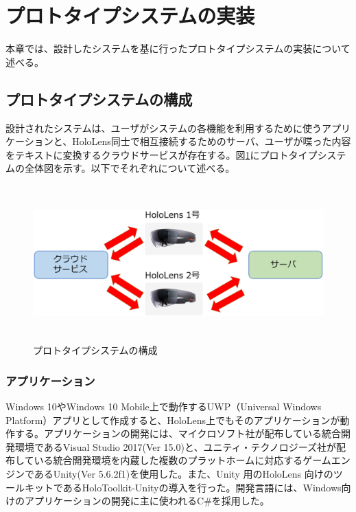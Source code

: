 \documentclass[11pt,a4j, titlepage]{jarticle} %
\begin{document}
\newpage
\section{プロトタイプシステムの実装}
本章では、設計したシステムを基に行ったプロトタイプシステムの実装について述べる。

\subsection{プロトタイプシステムの構成}
設計されたシステムは、ユーザがシステムの各機能を利用するために使うアプリケーションと、HoloLens同士で相互接続するためのサーバ、ユーザが喋った内容をテキストに変換するクラウドサービスが存在する。図\ref{fig:prototypesystem}にプロトタイプシステムの全体図を示す。以下でそれぞれについて述べる。

\begin{figure}[H]
  \begin{center}
    \includegraphics[clip,height=6.0cm,width=14.0cm]{./prototypesystem.eps}
    \caption{プロトタイプシステムの構成}
    \label{fig:prototypesystem}
  \end{center}
\end{figure}

\subsubsection{アプリケーション}
Windows 10やWindows 10 Mobile上で動作するUWP（Universal Windows Platform）アプリとして作成すると、HoloLens上でもそのアプリケーションが動作する。アプリケーションの開発には、マイクロソフト社が配布している統合開発環境であるVisual Studio 2017\cite{visualstudio}(Ver 15.0)と、ユニティ・テクノロジーズ社が配布している統合開発環境を内蔵した複数のプラットホームに対応するゲームエンジンであるUnity\cite{unity}(Ver 5.6.2f1)を使用した。また、Unity 用のHoloLens 向けのツールキットであるHoloToolkit-Unity\cite{holotoolkit}の導入を行った。開発言語には、Windows向けのアプリケーションの開発に主に使われるC\#を採用した。
\end{document}
